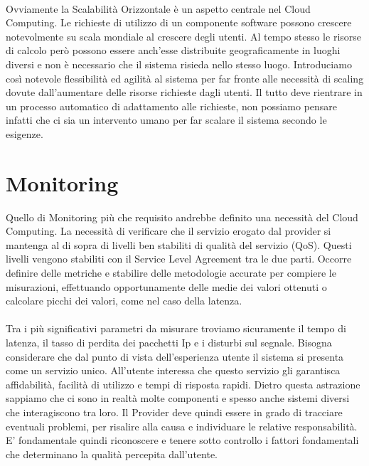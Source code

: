\paragraph{}
Ovviamente la Scalabilità Orizzontale è un aspetto centrale nel Cloud Computing. Le richieste di utilizzo di un componente software possono crescere notevolmente su scala mondiale al crescere degli utenti. Al tempo stesso le risorse di calcolo però possono essere anch'esse distribuite geograficamente in luoghi diversi e non è necessario che il sistema risieda nello stesso luogo. Introduciamo così notevole flessibilità ed agilità al sistema per far fronte alle necessità di scaling dovute dall'aumentare delle risorse richieste dagli utenti. Il tutto deve rientrare in un processo automatico di adattamento alle richieste, non possiamo pensare infatti che ci sia un intervento umano per far scalare il sistema secondo le esigenze.

\section{Monitoring}
Quello di Monitoring più che requisito andrebbe definito una necessità del Cloud Computing. La necessità di verificare che il servizio erogato dal provider si mantenga al di sopra di livelli ben stabiliti di qualità del servizio (QoS). Questi livelli vengono stabiliti con il Service Level Agreement tra le due parti. Occorre definire delle metriche e stabilire delle metodologie accurate per compiere le misurazioni, effettuando opportunamente delle medie dei valori ottenuti o calcolare picchi dei valori, come nel caso della latenza.

\paragraph{}
Tra i più significativi parametri da misurare troviamo sicuramente il tempo di latenza, il tasso di perdita dei pacchetti Ip e i disturbi sul segnale. Bisogna considerare che dal punto di vista dell'esperienza utente il sistema si presenta come un servizio unico. All'utente interessa che questo servizio gli garantisca affidabilità, facilità di utilizzo e tempi di risposta rapidi. Dietro questa astrazione sappiamo che ci sono in realtà molte componenti e spesso anche sistemi diversi che interagiscono tra loro. Il Provider deve quindi essere in grado di tracciare eventuali problemi, per risalire alla causa e individuare le relative responsabilità. E' fondamentale quindi riconoscere e tenere sotto controllo i fattori  fondamentali che determinano la qualità percepita dall'utente.




